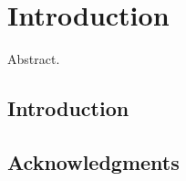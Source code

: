 \chapter{Introduction}
\label{c.intro}

Abstract.

\section{Introduction}


\section*{Acknowledgments}
